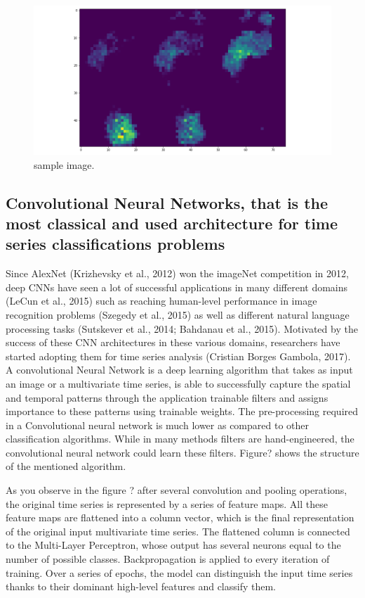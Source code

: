 \documentclass[review]{elsarticle}
\begin{document}
\begin{figure}
    \centering
    \begin{minipage}[b]{.5\textwidth}
        \includegraphics[width=\textwidth]{figures/project/frame1.png}
    \end{minipage}
    \caption{sample image.}
    \label{fig:a1}
\end{figure}

\subsection{Convolutional Neural Networks, that is the most classical and used architecture for time series classifications problems}
Since AlexNet (Krizhevsky et al., 2012) won the imageNet competition in 2012, deep CNNs have seen a lot of successful applications in many different domains (LeCun et al., 2015) such as reaching human-level performance in image recognition problems (Szegedy et al., 2015) as well as different natural language processing tasks (Sutskever et al., 2014; Bahdanau et al., 2015). Motivated by the success of these CNN architectures in these various domains, researchers have started adopting them for time series analysis (Cristian Borges Gambola, 2017).  
A convolutional Neural Network is a deep learning algorithm that takes as input an image or a multivariate time series, is able to successfully capture the spatial and temporal patterns through the application trainable filters and assigns importance to these patterns using trainable weights. The pre-processing required in a Convolutional neural network is much lower as compared to other classification algorithms. While in many methods filters are hand-engineered, the convolutional neural network could learn these filters. Figure? shows the structure of the mentioned algorithm. 

As you observe in the figure ? after several convolution and pooling operations, the original time series is represented by a series of feature maps. All these feature maps are flattened into a column vector, which is the final representation of the original input multivariate time series. The flattened column is connected to the Multi-Layer Perceptron, whose output has several neurons equal to the number of possible classes. 
Backpropagation is applied to every iteration of training. Over a series of epochs, the model can distinguish the input time series thanks to their dominant high-level features and classify them. 
\end{document}
